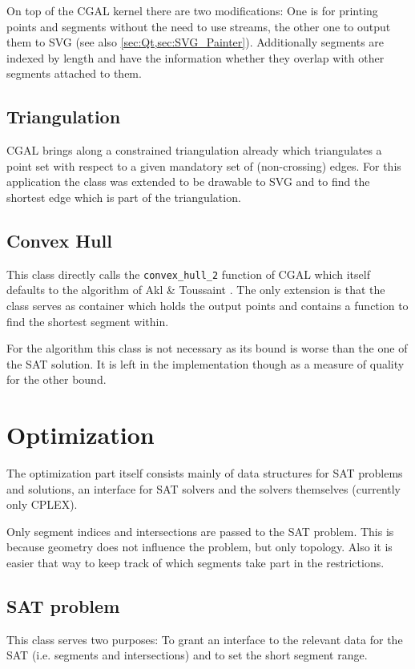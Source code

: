 On top of the CGAL kernel there are two modifications: One is for
printing points and segments without the need to use streams, the
other one to output them to SVG (see also
\cref{sec:Qt,sec:SVG_Painter}). Additionally segments are indexed by
length and have the information whether they overlap with other
segments attached to them.

\subsection{Triangulation}
CGAL brings along a constrained triangulation already
\cite{cgal_manual_constrained_triangulation}
which triangulates a point set with respect to a given mandatory set
of (non-crossing) edges. For this application the class was extended
to be drawable to SVG and to find the shortest edge which is part of
the triangulation.

\subsection{Convex Hull}
This class directly calls the \verb|convex_hull_2| function of CGAL
\cite{cgal_manual_convex_hull} which itself defaults to the algorithm
of Akl \& Toussaint \cite{convex_hull}. The only extension is that
the class serves as container
which holds the output points and contains a function to find the 
shortest segment within.

For the algorithm this class is not necessary as its bound is worse
than the one of the SAT solution. It is left in the implementation
though as a measure of quality for the other bound.

\section{Optimization}
The optimization part itself consists mainly of data structures for
SAT problems and solutions, an interface for SAT solvers and the
solvers themselves (currently only CPLEX).

Only segment indices and intersections are passed to the SAT problem.
This is because geometry does not influence the problem, but only
topology. Also it is easier that way to keep track of which segments
take part in the restrictions.

\subsection{SAT problem}
This class serves two purposes: To grant an interface to the relevant
data for the SAT (i.e. segments and intersections) and to set the
short segment range.

